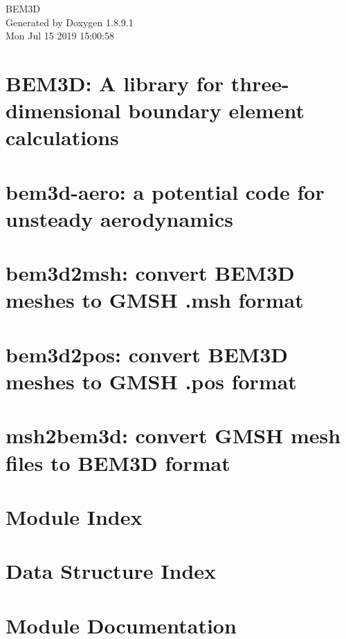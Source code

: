 \documentclass[twoside]{book}
\newcommand{\+}{\discretionary{\mbox{\scriptsize$\hookleftarrow$}}{}{}}
\newcommand{\clearemptydoublepage}{%
  \newpage{\pagestyle{empty}\cleardoublepage}%
}
\begin{document}
\begin{titlepage}
\vspace*{7cm}
\begin{center}%
{\Large B\+E\+M3\+D }\\
\vspace*{1cm}
{\large Generated by Doxygen 1.8.9.1}\\
\vspace*{0.5cm}
{\small Mon Jul 15 2019 15:00:58}\\
\end{center}
\end{titlepage}
\clearemptydoublepage
\tableofcontents
\clearemptydoublepage
{}

\chapter{B\+E\+M3\+D\+: A library for three-\/dimensional boundary element calculations}
\label{index}
\chapter{bem3d-\/aero\+: a potential code for unsteady aerodynamics}
\label{bem3daero}

\chapter{bem3d2msh\+: convert B\+E\+M3\+D meshes to G\+M\+S\+H .msh format}
\label{bem3d2msh}

\chapter{bem3d2pos\+: convert B\+E\+M3\+D meshes to G\+M\+S\+H .pos format}
\label{bem3d2pos}

\chapter{msh2bem3d\+: convert G\+M\+S\+H mesh files to B\+E\+M3\+D format}
\label{msh2bem3d}

\chapter{Module Index}

\chapter{Data Structure Index}

\chapter{Module Documentation}
























\end{document}

